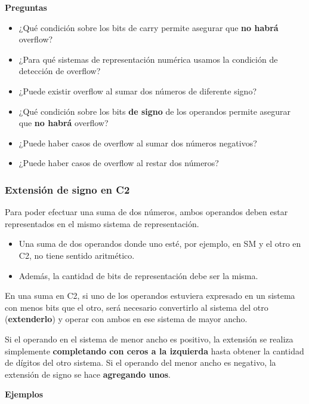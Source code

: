 \documentclass[spanish,A4,]{article}
\begin{document}
\textbf{Preguntas}

\begin{itemize}
\itemsep1pt\parskip0pt
\item
  ¿Qué condición sobre los bits de carry permite asegurar que \textbf{no
  habrá} overflow?
\item
  ¿Para qué sistemas de representación numérica usamos la condición de
  detección de overflow?
\item
  ¿Puede existir overflow al sumar dos números de diferente signo?
\item
  ¿Qué condición sobre los bits \textbf{de signo} de los operandos
  permite asegurar que \textbf{no habrá} overflow?
\item
  ¿Puede haber casos de overflow al sumar dos números negativos?
\item
  ¿Puede haber casos de overflow al restar dos números?
\end{itemize}

\subsubsection{Extensión de signo en
C2}\label{extensiuxf3n-de-signo-en-c2}

Para poder efectuar una suma de dos números, ambos operandos deben estar
representados en el mismo sistema de representación.

\begin{itemize}
\itemsep1pt\parskip0pt
\item
  Una suma de dos operandos donde uno esté, por ejemplo, en SM y el otro
  en C2, no tiene sentido aritmético.
\item
  Además, la cantidad de bits de representación debe ser la misma.
\end{itemize}

En una suma en C2, si uno de los operandos estuviera expresado en un
sistema con menos bits que el otro, será necesario convertirlo al
sistema del otro (\textbf{extenderlo}) y operar con ambos en ese sistema
de mayor ancho.

Si el operando en el sistema de menor ancho es positivo, la extensión se
realiza simplemente \textbf{completando con ceros a la izquierda} hasta
obtener la cantidad de dígitos del otro sistema. Si el operando del
menor ancho es negativo, la extensión de signo se hace \textbf{agregando
unos}.

\textbf{Ejemplos}
\end{document}
